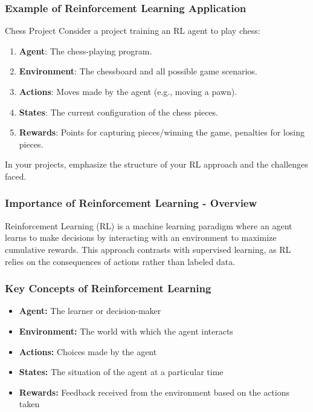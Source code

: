 \documentclass[aspectratio=169]{beamer}
\begin{document}
\begin{frame}[fragile]
    \frametitle{Example of Reinforcement Learning Application}
    \begin{block}{Chess Project}
        Consider a project training an RL agent to play chess:
        
        \begin{enumerate}
            \item \textbf{Agent}: The chess-playing program.
            \item \textbf{Environment}: The chessboard and all possible game scenarios.
            \item \textbf{Actions}: Moves made by the agent (e.g., moving a pawn).
            \item \textbf{States}: The current configuration of the chess pieces.
            \item \textbf{Rewards}: Points for capturing pieces/winning the game, penalties for losing pieces.
        \end{enumerate}
    \end{block}
    In your projects, emphasize the structure of your RL approach and the challenges faced.
\end{frame}

\begin{frame}[fragile]
    \frametitle{Importance of Reinforcement Learning - Overview}
    Reinforcement Learning (RL) is a machine learning paradigm where an agent learns to make decisions by interacting with an environment to maximize cumulative rewards. This approach contrasts with supervised learning, as RL relies on the consequences of actions rather than labeled data.
\end{frame}

\begin{frame}[fragile]
    \frametitle{Key Concepts of Reinforcement Learning}
    \begin{itemize}
        \item \textbf{Agent:} The learner or decision-maker
        \item \textbf{Environment:} The world with which the agent interacts
        \item \textbf{Actions:} Choices made by the agent
        \item \textbf{States:} The situation of the agent at a particular time
        \item \textbf{Rewards:} Feedback received from the environment based on the actions taken
    \end{itemize}
\end{frame}
\end{document}
